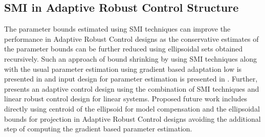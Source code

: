 \subsection{SMI in Adaptive Robust Control Structure}

The parameter bounds estimated using SMI techniques can improve the performance in Adaptive Robust Control designs as
the conservative estimates of the parameter bounds can be further reduced using ellipsoidal sets obtained recursively.
Such an approach of bound shrinking by using SMI techniques along with the usual parameter estimation using gradient
based adaptation low is presented in \cite{lu2009set} and input design for parameter estimation is presented in
\cite{lu2010experimental}. Further, \cite{kosut1992set} presents an adaptive control design using the combination of SMI
techniques and linear robust control design for linear systems. Proposed future work includes directly using centroid of
the ellipsoid for model compensation and the ellipsoidal bounds for projection in Adaptive Robust Control designs
avoiding the additional step of computing the gradient based parameter estimation.
